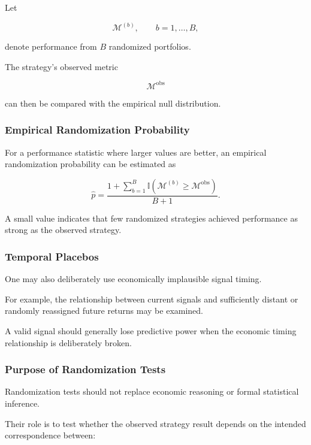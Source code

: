 \documentclass[11pt,a4paper]{article}
\begin{document}
Let

\begin{equation}
\mathcal{M}^{(b)},
\qquad
b=1,\ldots,B,
\end{equation}

denote performance from $B$ randomized portfolios.

The strategy's observed metric

\begin{equation}
\mathcal{M}^{\mathrm{obs}}
\end{equation}

can then be compared with the empirical null distribution.


\subsubsection{Empirical Randomization Probability}

For a performance statistic where larger values are better, an empirical
randomization probability can be estimated as

\begin{equation}
\boxed{
\widehat{p}
=
\frac{
1+
\sum_{b=1}^{B}
\mathbb{I}
\left(
\mathcal{M}^{(b)}
\geq
\mathcal{M}^{\mathrm{obs}}
\right)
}{
B+1
}.
}
\end{equation}

A small value indicates that few randomized strategies achieved performance as
strong as the observed strategy.


\subsubsection{Temporal Placebos}

One may also deliberately use economically implausible signal timing.

For example, the relationship between current signals and sufficiently distant
or randomly reassigned future returns may be examined.

A valid signal should generally lose predictive power when the economic timing
relationship is deliberately broken.


\subsubsection{Purpose of Randomization Tests}

Randomization tests should not replace economic reasoning or formal statistical
inference.

Their role is to test whether the observed strategy result depends on the
intended correspondence between:
\end{document}
